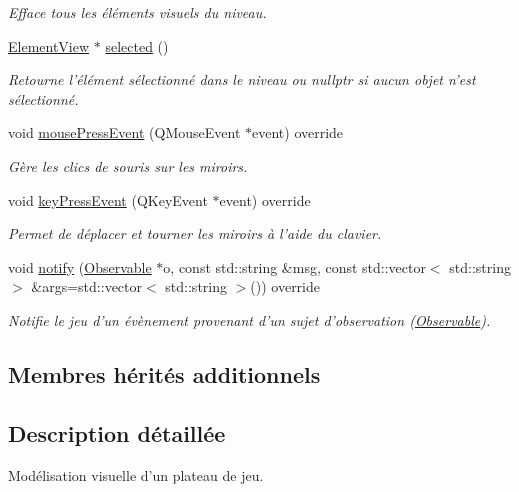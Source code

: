 \begin{DoxyCompactItemize}
\begin{DoxyCompactList}\small\item\em Efface tous les éléments visuels du niveau. \end{DoxyCompactList}\item 
\hyperlink{classElementView}{Element\+View} $\ast$ \hyperlink{classMapView_ab1af933413ea299a5f6d735561623471}{selected} ()
\begin{DoxyCompactList}\small\item\em Retourne l’élément sélectionné dans le niveau ou nullptr si aucun objet n’est sélectionné. \end{DoxyCompactList}\item 
void \hyperlink{classMapView_accba42446f4e70fe4c6f1754b9d45ba9}{mouse\+Press\+Event} (Q\+Mouse\+Event $\ast$event) override
\begin{DoxyCompactList}\small\item\em Gère les clics de souris sur les miroirs. \end{DoxyCompactList}\item 
void \hyperlink{classMapView_adae3dabcee35e111b3566b2d3deeb007}{key\+Press\+Event} (Q\+Key\+Event $\ast$event) override
\begin{DoxyCompactList}\small\item\em Permet de déplacer et tourner les miroirs à l’aide du clavier. \end{DoxyCompactList}\item 
void \hyperlink{classMapView_af57740f402cad958653bdba417f87fe0}{notify} (\hyperlink{classObservable}{Observable} $\ast$o, const std\+::string \&msg, const std\+::vector$<$ std\+::string $>$ \&args=std\+::vector$<$ std\+::string $>$()) override
\begin{DoxyCompactList}\small\item\em Notifie le jeu d'un évènement provenant d'un sujet d'observation (\hyperlink{classObservable}{Observable}). \end{DoxyCompactList}\end{DoxyCompactItemize}
\subsection*{Membres hérités additionnels}


\subsection{Description détaillée}
Modélisation visuelle d’un plateau de jeu. 

